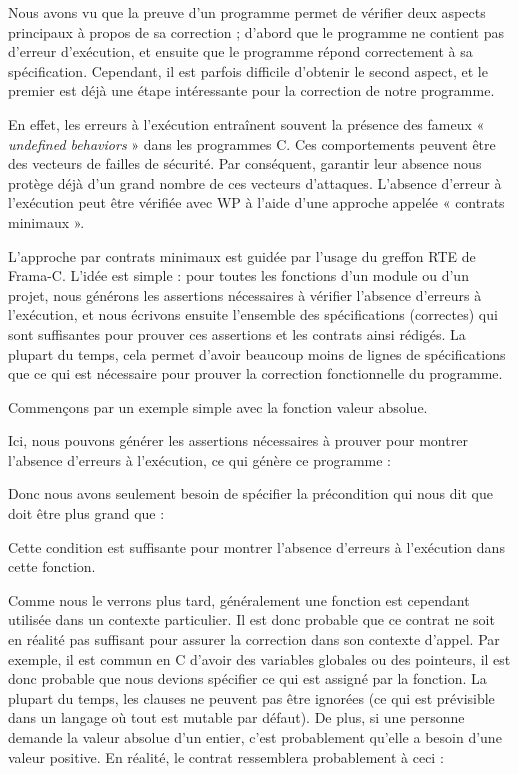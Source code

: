 Nous avons vu que la preuve d'un programme permet de vérifier deux aspects
principaux à propos de sa correction ; d'abord que le programme ne contient pas
d'erreur d'exécution, et ensuite que le programme répond correctement à sa
spécification. Cependant, il est parfois difficile d'obtenir le second aspect,
et le premier est déjà une étape intéressante pour la correction de notre programme.


En effet, les erreurs à l'exécution entraînent souvent la présence des fameux
« \textit{undefined behaviors} » dans les programmes C. Ces comportements peuvent être
des vecteurs de failles de sécurité. Par conséquent, garantir leur absence nous
protège déjà d'un grand nombre de ces vecteurs d'attaques. L'absence d'erreur à
l'exécution peut être vérifiée avec WP à l'aide d'une approche appelée
« contrats minimaux ».




L'approche par contrats minimaux est guidée par l'usage du greffon RTE de Frama-C.
L'idée est simple : pour toutes les fonctions d'un module ou d'un projet,
nous générons les assertions nécessaires à vérifier l'absence d'erreurs à l'exécution,
et nous écrivons ensuite l'ensemble des spécifications (correctes) qui sont suffisantes
pour prouver ces assertions et les contrats ainsi rédigés. La plupart du temps, cela
permet d'avoir beaucoup moins de lignes de spécifications que ce qui est nécessaire
pour prouver la correction fonctionnelle du programme.


Commençons par un exemple simple avec la fonction valeur absolue.




Ici, nous pouvons générer les assertions nécessaires à prouver pour montrer
l'absence d'erreurs à l'exécution, ce qui génère ce programme :




Donc nous avons seulement besoin de spécifier la précondition qui nous dit que
 doit être plus grand que  :




Cette condition est suffisante pour montrer l'absence d'erreurs à l'exécution
dans cette fonction.


Comme nous le verrons plus tard, généralement une fonction est cependant utilisée
dans un contexte particulier. Il est donc probable que ce contrat ne soit en
réalité pas suffisant pour assurer la correction dans son contexte d'appel. Par
exemple, il est commun en C d'avoir des variables globales ou des pointeurs, il
est donc probable que nous devions spécifier ce qui est assigné par la fonction.
La plupart du temps, les clauses  ne peuvent pas être ignorées
(ce qui est prévisible dans un langage où tout est mutable par défaut). De plus,
si une personne demande la valeur absolue d'un entier, c'est probablement qu'elle
a besoin d'une valeur positive. En réalité, le contrat ressemblera probablement à
ceci :


